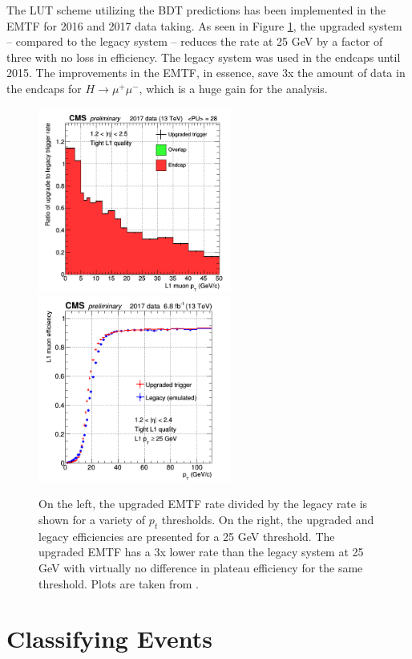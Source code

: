 The LUT scheme utilizing the BDT predictions has been implemented in the EMTF for 2016 and 2017 data taking. As seen in Figure \ref{fig:results}, the upgraded system -- compared to the legacy system -- reduces the rate at 25 GeV by a factor of three with no loss in efficiency. The legacy system was used in the endcaps until 2015. The improvements in the EMTF, in essence, save 3x the amount of data in the endcaps for $H\rightarrow\mu^+\mu^-$, which is a huge gain for the analysis.

\begin{figure}[h!]
  \centering
  \includegraphics[width=2.5in]{images/emtf_rate_reduction.png}
  \includegraphics[width=2.5in]{images/emtf_efficiency.png}
  \caption[EMTF rate reduction and efficiency.]
   {On the left, the upgraded EMTF rate divided by the legacy rate is shown for a variety of $p_t$ thresholds. On the right, the upgraded and legacy efficiencies are presented for a 25 GeV threshold. The upgraded EMTF has a 3x lower rate than the legacy system at 25 GeV with virtually no difference in plateau efficiency for the same threshold. Plots are taken from \cite{CMS-DP-2017-041}.}
\label{fig:results}
\end{figure}

\section{Classifying Events}

